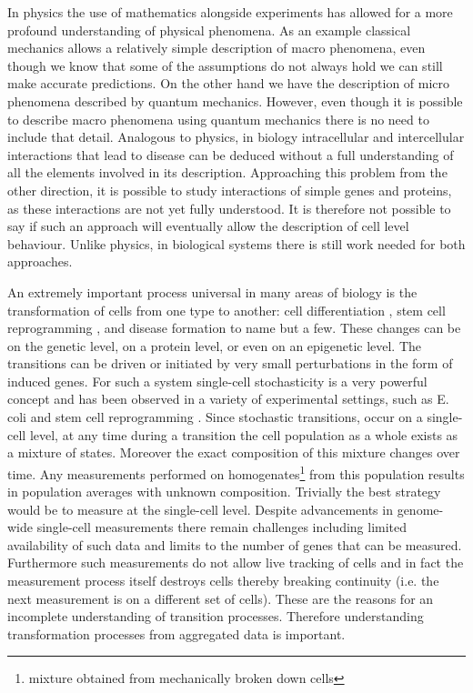 In physics the use of mathematics alongside experiments has allowed for a more profound understanding of physical phenomena. As an example classical mechanics allows a relatively simple description of macro phenomena, even though we know that some of the assumptions do not always hold we can still make accurate predictions. On the other hand we have the description of micro phenomena described by quantum mechanics. However, even though it is possible to describe macro phenomena using quantum mechanics there is no need to include that detail. %
Analogous to physics, in biology intracellular and intercellular interactions that lead to disease can be deduced without a full understanding of all the elements involved in its description. Approaching this problem from the other direction, it is possible to study interactions of simple genes and proteins, as these interactions are not yet fully understood. It is therefore not possible to say if such an approach will eventually allow the description of cell level behaviour. Unlike physics, in biological systems there is still work needed for both approaches.

An extremely important process universal in many areas of biology is the transformation of cells from one type to another: cell differentiation \citep{Tang:2010ed, Vierbuchen:2010fa}, stem cell reprogramming \citep{Takahashi:2006hi, Hanna:2010jy}, and disease formation \citep{Hannah:2000wo, Vogel:2010jb} to name but a few. These changes can be on the genetic level, on a protein level, or even on an epigenetic level. The transitions can be driven or initiated by very small perturbations in the form of induced genes. For such a system single-cell stochasticity is a very powerful concept and has been observed in a variety of experimental settings, such as E. coli  \citep{Elowitz:2002hb} and stem cell reprogramming \citep{Hanna:2009ix}. Since stochastic transitions, occur on a single-cell level, at any time during a transition the cell population as a whole exists as a mixture of states. Moreover the exact composition of this mixture changes over time. Any measurements performed on homogenates\footnote{mixture obtained from mechanically broken down cells} from this population results in population averages with unknown composition. Trivially the best strategy would be to measure at the single-cell level. Despite advancements in genome-wide single-cell measurements \citep{deSouza:2012dz, Tang:2011gt} there remain challenges including limited availability of such data and limits to the number of genes that can be measured. Furthermore such measurements do not allow live tracking of cells and in fact the measurement process itself destroys cells thereby breaking continuity (i.e. the next measurement is on a different set of cells). These are the reasons for an incomplete understanding of transition processes. Therefore understanding transformation processes from aggregated data is important.

